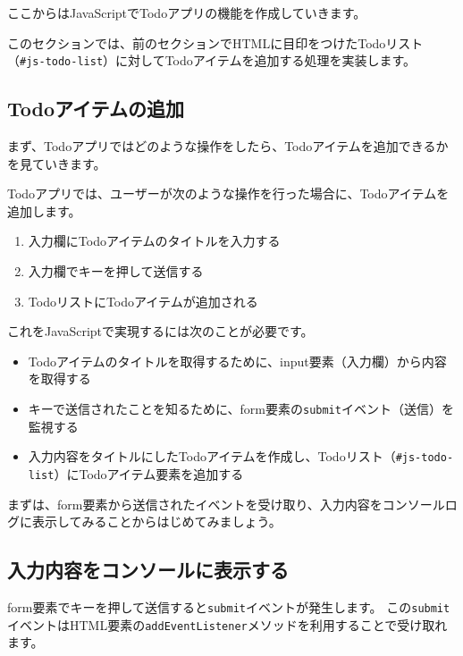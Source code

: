ここからはJavaScriptでTodoアプリの機能を作成していきます。

このセクションでは、前のセクションでHTMLに目印をつけたTodoリスト（\texttt{\#js-todo-list}）に対してTodoアイテムを追加する処理を実装します。

\hypertarget{add-todo-item}{%
\subsection{Todoアイテムの追加}\label{add-todo-item}}

まず、Todoアプリではどのような操作をしたら、Todoアイテムを追加できるかを見ていきます。

Todoアプリでは、ユーザーが次のような操作を行った場合に、Todoアイテムを追加します。

\begin{enumerate}
\def\labelenumi{\arabic{enumi}.}
\item
  入力欄にTodoアイテムのタイトルを入力する
\item
  入力欄でキーを押して送信する
\item
  TodoリストにTodoアイテムが追加される
\end{enumerate}

これをJavaScriptで実現するには次のことが必要です。

\begin{itemize}
\item
  Todoアイテムのタイトルを取得するために、input要素（入力欄）から内容を取得する
\item
  キーで送信されたことを知るために、form要素の\texttt{submit}イベント（送信）を監視する
\item
  入力内容をタイトルにしたTodoアイテムを作成し、Todoリスト（\texttt{\#js-todo-list}）にTodoアイテム要素を追加する
\end{itemize}

まずは、form要素から送信されたイベントを受け取り、入力内容をコンソールログに表示してみることからはじめてみましょう。

\hypertarget{input-to-console}{%
\subsection{入力内容をコンソールに表示する}\label{input-to-console}}

form要素でキーを押して送信すると\texttt{submit}イベントが発生します。
この\texttt{submit}イベントはHTML要素の\texttt{addEventListener}メソッドを利用することで受け取れます。

